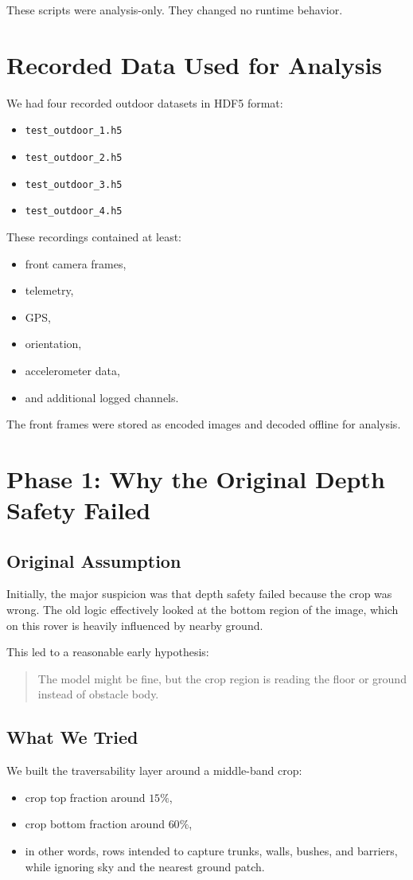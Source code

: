 \documentclass[11pt]{article}
\begin{document}
These scripts were analysis-only. They changed no runtime behavior.

\section{Recorded Data Used for Analysis}
We had four recorded outdoor datasets in HDF5 format:
\begin{itemize}[leftmargin=*]
\item \texttt{test\_outdoor\_1.h5}
\item \texttt{test\_outdoor\_2.h5}
\item \texttt{test\_outdoor\_3.h5}
\item \texttt{test\_outdoor\_4.h5}
\end{itemize}

These recordings contained at least:
\begin{itemize}[leftmargin=*]
\item front camera frames,
\item telemetry,
\item GPS,
\item orientation,
\item accelerometer data,
\item and additional logged channels.
\end{itemize}

The front frames were stored as encoded images and decoded offline for analysis.

\section{Phase 1: Why the Original Depth Safety Failed}
\subsection{Original Assumption}
Initially, the major suspicion was that depth safety failed because the crop was wrong. The old logic effectively looked at the bottom region of the image, which on this rover is heavily influenced by nearby ground.

This led to a reasonable early hypothesis:
\begin{quote}
The model might be fine, but the crop region is reading the floor or ground instead of obstacle body.
\end{quote}

\subsection{What We Tried}
We built the traversability layer around a middle-band crop:
\begin{itemize}[leftmargin=*]
\item crop top fraction around $15\%$,
\item crop bottom fraction around $60\%$,
\item in other words, rows intended to capture trunks, walls, bushes, and barriers, while ignoring sky and the nearest ground patch.
\end{itemize}
\end{document}
